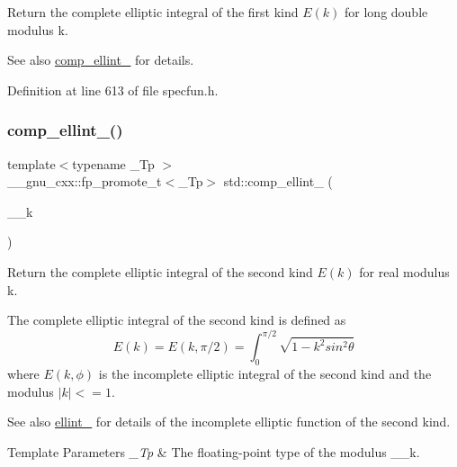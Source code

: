 Return the complete elliptic integral of the first kind $ E(k) $ for {\ttfamily long double} modulus {\ttfamily k}.

\begin{DoxySeeAlso}{See also}
\hyperlink{group__mathsf__std_gad559217fb01e7a8b7a6e23eeedda64be}{comp\+\_\+ellint\+\_} for details. 
\end{DoxySeeAlso}


Definition at line 613 of file specfun.\+h.

\mbox{\label{group__mathsf__std_gaadf288465eea84ec609d93de96200aaa}} 
\subsubsection{\texorpdfstring{comp\+\_\+ellint\+\_()}{comp\_ellint\_2()}}
{\footnotesize\ttfamily template$<$typename \+\_\+\+Tp $>$ \\
\+\_\+\+\_\+gnu\+\_\+cxx\+::fp\+\_\+promote\+\_\+t$<$\+\_\+\+Tp$>$ std\+::comp\+\_\+ellint\+\_ (\begin{DoxyParamCaption}\item[{\+\_\+\+Tp}]{\+\_\+\+\_\+k }\end{DoxyParamCaption})\hspace{0.3cm}{\ttfamily [inline]}}

Return the complete elliptic integral of the second kind $ E(k) $ for real modulus {\ttfamily k}.

The complete elliptic integral of the second kind is defined as \[ E(k) = E(k,\pi/2) = \int_0^{\pi/2}\sqrt{1 - k^2 sin^2\theta} \] where $ E(k,\phi) $ is the incomplete elliptic integral of the second kind and the modulus $ |k| <= 1 $. \begin{DoxySeeAlso}{See also}
\hyperlink{group__mathsf__std_gad64cb9babb7837d585912b1a94b2cb7d}{ellint\+\_} for details of the incomplete elliptic function of the second kind.
\end{DoxySeeAlso}

\begin{DoxyTemplParams}{Template Parameters}
{\em \+\_\+\+Tp} & The floating-\/point type of the modulus {\ttfamily \+\_\+\+\_\+k}. \\
\hline
\end{DoxyTemplParams}

